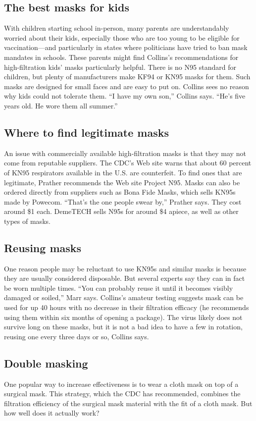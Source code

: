 \documentclass[a4paper, 14pt]{extarticle}
\begin{document}
\subsection*{The best masks for kids}
With children starting school in-person, many parents are understandably worried about their kids, especially those who are too young to be eligible for vaccination—and particularly in states where politicians have tried to ban mask mandates in schools. These parents might find Collins’s recommendations for high-filtration kids’ masks particularly helpful. There is no N95 standard for children, but plenty of manufacturers make KF94 or KN95 masks for them. Such masks are designed for small faces and are easy to put on. Collins sees no reason why kids could not tolerate them. “I have my own son,” Collins says. “He’s five years old. He wore them all summer.”

\subsection*{Where to find legitimate masks}
An issue with commercially available high-filtration masks is that they may not come from reputable suppliers. The CDC’s Web site warns that about 60 percent of KN95 respirators available in the U.S. are counterfeit. To find ones that are legitimate, Prather recommends the Web site Project N95. Masks can also be ordered directly from suppliers such as Bona Fide Masks, which sells KN95s made by Powecom. “That’s the one people swear by,” Prather says. They cost around \$1 each. DemeTECH sells N95s for around \$4 apiece, as well as other types of masks.

\subsection*{Reusing masks}
One reason people may be reluctant to use KN95s and similar masks is because they are usually considered disposable. But several experts say they can in fact be worn multiple times. “You can probably reuse it until it becomes visibly damaged or soiled,” Marr says. Collins’s amateur testing suggests mask can be used for up 40 hours with no decrease in their filtration efficacy (he recommends using them within six months of opening a package). The virus likely does not survive long on these masks, but it is not a bad idea to have a few in rotation, reusing one every three days or so, Collins says.

\subsection*{Double masking}
One popular way to increase effectiveness is to wear a cloth mask on top of a surgical mask. This strategy, which the CDC has recommended, combines the filtration efficiency of the surgical mask material with the fit of a cloth mask. But how well does it actually work?
 
\end{document}

